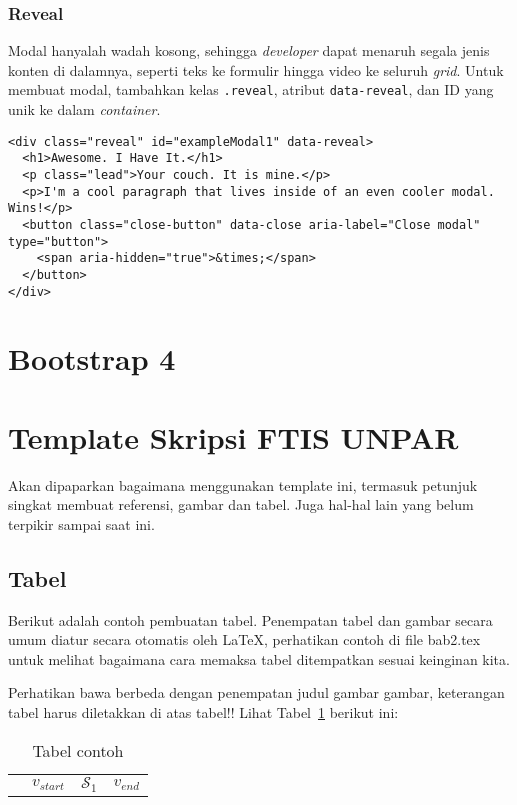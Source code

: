 \begin{enumerate}
\subsubsection{Reveal}
\label{subs:modals_javascript_zurb}
Modal hanyalah wadah kosong, sehingga \textit{developer} dapat menaruh segala jenis konten di dalamnya, seperti teks ke formulir hingga video ke seluruh \textit{grid}.
Untuk membuat modal, tambahkan kelas \texttt{.reveal}, atribut \texttt{data-reveal}, dan ID yang unik ke dalam \textit{container}.

\begin{lstlisting}[frame=single] 
<div class="reveal" id="exampleModal1" data-reveal>
  <h1>Awesome. I Have It.</h1>
  <p class="lead">Your couch. It is mine.</p>
  <p>I'm a cool paragraph that lives inside of an even cooler modal. Wins!</p>
  <button class="close-button" data-close aria-label="Close modal" type="button">
    <span aria-hidden="true">&times;</span>
  </button>
</div>
\end{lstlisting}
 

\section{Bootstrap 4}
\label{sec:bootstrap4}
 
\section{Template Skripsi FTIS UNPAR}
\label{sec:template}
 
Akan dipaparkan bagaimana menggunakan template ini, termasuk petunjuk singkat membuat referensi, gambar dan tabel.
Juga hal-hal lain yang belum terpikir sampai saat ini. 
 

\subsection{Tabel}  
Berikut adalah contoh pembuatan tabel. 
Penempatan tabel dan gambar secara umum diatur secara otomatis oleh \LaTeX{}, perhatikan contoh di file bab2.tex untuk melihat bagaimana cara memaksa tabel ditempatkan sesuai keinginan kita.

Perhatikan bawa berbeda dengan penempatan judul gambar gambar, keterangan tabel harus diletakkan di atas tabel!!
Lihat Tabel~\ref{tab:contoh1} berikut ini:

\begin{table}[H] %
	\centering 
	\caption{Tabel contoh}
	\label{tab:contoh1}
	\begin{tabular}{cccc}
		\toprule
		& $v_{start}$ & $\mathcal{S}_{1}$ & $v_{end}$\\


\end{tabular}
\end{table}
\end{enumerate}
